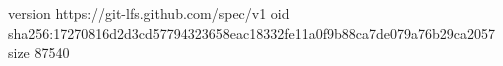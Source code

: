 version https://git-lfs.github.com/spec/v1
oid sha256:17270816d2d3cd57794323658eac18332fe11a0f9b88ca7de079a76b29ca2057
size 87540
